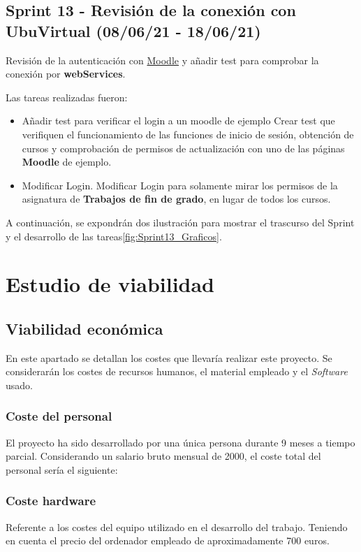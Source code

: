 \subsection{Sprint 13 - Revisión de la conexión con UbuVirtual (08/06/21 - 18/06/21)}
Revisión de la autenticación con \href{https://moodle.org/}{Moodle} y añadir test para comprobar la conexión por \textbf{webServices}.

Las tareas realizadas fueron:
\begin{itemize}
	\tightlist
	\item Añadir test para verificar el login a un moodle de ejemplo
		Crear test que verifiquen el funcionamiento de las funciones de inicio de sesión, obtención de cursos y comprobación de permisos de actualización con uno de las páginas \textbf{Moodle} de ejemplo.
	\item Modificar Login.
		Modificar Login para solamente mirar los permisos de la asignatura de \textbf{Trabajos de fin de grado}, en lugar de todos los cursos.
	
\end{itemize}

A continuación, se expondrán dos ilustración para mostrar el trascurso del Sprint y el desarrollo de las tareas\ref{fig:Sprint13_Graficos}.



\section{Estudio de viabilidad}
\subsection{Viabilidad económica}
En este apartado se detallan los costes que llevaría realizar este proyecto. Se considerarán los costes de recursos humanos, el material empleado y el \emph{Software} usado. 

\subsubsection{Coste del personal}
El proyecto ha sido desarrollado por una única persona durante 9 meses a tiempo parcial. Considerando un salario bruto mensual de 2000, el coste total del personal sería el siguiente:

\subsubsection{Coste hardware}
Referente a los costes del equipo utilizado en el desarrollo del trabajo. Teniendo en cuenta el precio del ordenador empleado de aproximadamente 700 euros.


